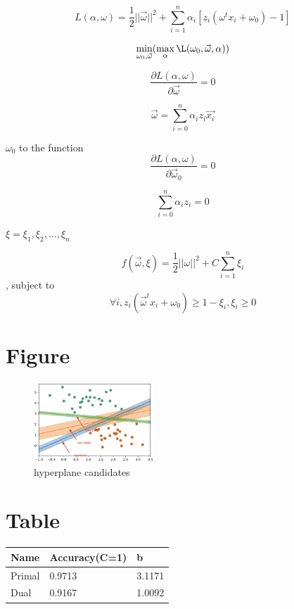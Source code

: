 \documentclass[12pt,twocolumn,letterpaper]{article}
\begin{document}
\[L(\alpha,\omega)=\dfrac{1}{2}||\vec\omega||^2+\sum^n_{i=1} {\alpha_i[z_i(\omega^tx_i+\omega_0)-1]}\]

\[ \min_{\omega_0,\vec\omega} (\max_\alpha \L(\omega_0,\vec\omega,\alpha))\]

\[\dfrac{\partial L(\alpha,\omega)}{\partial{\vec\omega}}=0\]

\[\vec\omega=\sum^n_{i=0}\alpha_i {z_i} \vec{x_i}\]

$\omega_0$ to the function \[ \dfrac{\partial L(\alpha,\omega)}{\partial{\vec\omega_0}}=0 \]

 \[ \sum_{i=0}^n \alpha_i z_i =0 \]

$\xi={\xi_1,\xi_2,...,\xi_n}$

\[f(\vec\omega,\xi)=\dfrac{1}{2} ||\omega||^2+C\sum^n_{i=1} \xi_i\], subject to \[ \forall i, z_i(\vec\omega^t x_i+\omega_0) \geq1-\xi_i, \xi_i \geq 0\]


\section{Figure}

\begin{figure}[h]
    \centering
    \includegraphics[width=0.4\textwidth]{max_margin.png}
    \caption{hyperplane candidates}
    \label{fig:hyperplane candidates}
\end{figure}


\section{Table}

\begin{table}[!h]
\small

\begin{center}
\begin{tabular}{|p{4cm}|p{4cm}|p{4cm}|}
\hline
Name & Accuracy(C=1)  & b
\\ \hline
Primal & 0.9713 & 3.1171
\\ \hline
Dual & 0.9167 & 1.0092
\\ \hline
\end{tabular}
\end{center}
\end{table}


{\small


}
\end{document}
